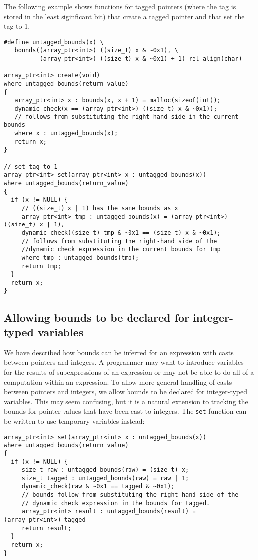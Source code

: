 The following example shows functions for tagged pointers
(where the tag is stored in the least siginficant bit) that
create a tagged pointer and that set the tag to 1.

\begin{verbatim}
#define untagged_bounds(x) \
   bounds((array_ptr<int>) ((size_t) x & ~0x1), \
          (array_ptr<int>) ((size_t) x & ~0x1) + 1) rel_align(char)

array_ptr<int> create(void) 
where untagged_bounds(return_value)
{
   array_ptr<int> x : bounds(x, x + 1) = malloc(sizeof(int));
   dynamic_check(x == (array_ptr<int>) ((size_t) x & ~0x1));
   // follows from substituting the right-hand side in the current bounds
   where x : untagged_bounds(x); 
   return x;
}

// set tag to 1
array_ptr<int> set(array_ptr<int> x : untagged_bounds(x)) 
where untagged_bounds(return_value)
{
  if (x != NULL) {
     // ((size_t) x | 1) has the same bounds as x                   
     array_ptr<int> tmp : untagged_bounds(x) = (array_ptr<int>) ((size_t) x | 1);
     dynamic_check((size_t) tmp & ~0x1 == (size_t) x & ~0x1);
     // follows from substituting the right-hand side of the
     //dynamic check expression in the current bounds for tmp
     where tmp : untagged_bounds(tmp);
     return tmp;
  }
  return x;
}
\end{verbatim}

\subsection{Allowing bounds to be declared for integer-typed variables}

We have described how bounds can be inferred for an expression with
casts between pointers and integers.  A programmer may want to
introduce variables for the results of subexpressions of an
expression or may not be able to do all of a computation within an expression.
To allow more general handling of casts between pointers and
integers, we allow bounds to be declared for integer-typed variables.
This may seem confusing, but it is a natural extension to tracking the
bounds for pointer values that have been cast to integers.   The \verb+set+
function can be written to use temporary variables instead:
\begin{verbatim}
array_ptr<int> set(array_ptr<int> x : untagged_bounds(x))
where untagged_bounds(return_value)
{
  if (x != NULL) {
     size_t raw : untagged_bounds(raw) = (size_t) x;
     size_t tagged : untagged_bounds(raw) = raw | 1;
     dynamic_check(raw & ~0x1 == tagged & ~0x1);
     // bounds follow from substituting the right-hand side of the
     // dynamic check expression in the bounds for tagged.
     array_ptr<int> result : untagged_bounds(result) = (array_ptr<int>) tagged
     return result;
  }
  return x;
}
\end{verbatim}

